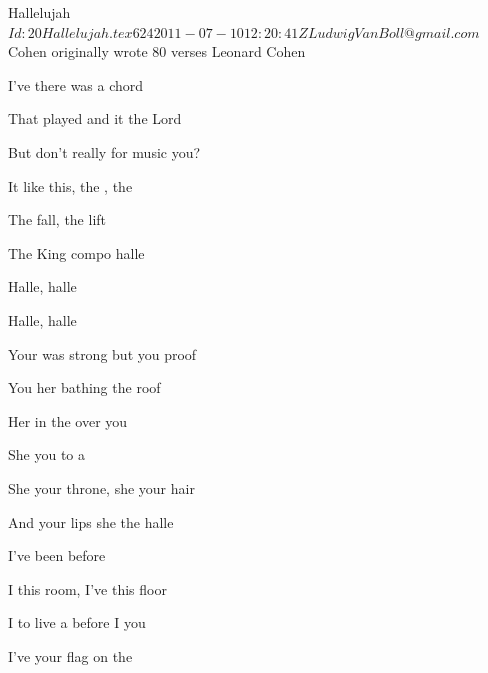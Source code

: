\begin{SBSong}{Hallelujah}
  {$Id: 20Hallelujah.tex 624 2011-07-10 12:20:41Z LudwigVanBoll@gmail.com $}
  {Cohen originally wrote 80 verses}
  {Leonard Cohen}
  \begin{SBVerse}
    I've  there was a  chord

    That  played and it  the Lord

    But  don't really  for music  you? 

    It  like this, the , the 
    
    The  fall, the  lift

    The  King compo halle
  \end{SBVerse}
  \begin{SBChorus}
    Halle, halle

    Halle, halle  
  \end{SBChorus}
  \begin{SBVerse}
    Your  was strong but you  proof
    
    You  her bathing  the roof
    
    Her  in the  over you 

    She  you to a  
    
    She  your throne, she  your hair
    
    And  your lips she  the halle
  \end{SBVerse}
  \begin{SBVerse}
     I've been  before
    
    I  this room, I've  this floor
    
    I  to live a before I  you 

    I've  your flag on the  
    

\end{SBVerse}
\end{SBSong}
